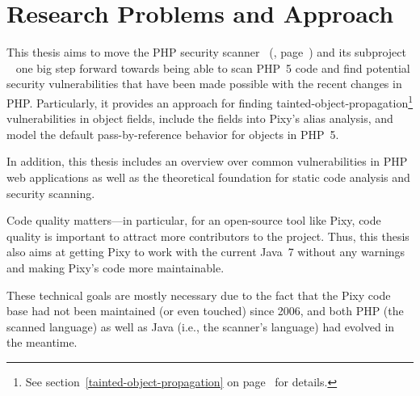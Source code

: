 \section{Research Problems and Approach}

This thesis aims to move the PHP security scanner ~(\cite{pixy}, page~\pageref{pixy}) and its subproject ~\cite{phpparser} one big step forward towards being able to scan PHP~5 code and find potential security vulnerabilities that have been made possible with the recent changes in PHP. Particularly, it provides an approach for finding tainted-object-propagation\footnote{See section~\ref{tainted-object-propagation} on page~\pageref{tainted-object-propagation} for details.} vulnerabilities in object fields, include the fields into Pixy's alias analysis, and model the default pass-by-reference behavior for objects in PHP~5.

In addition, this thesis includes an overview over common vulnerabilities in PHP web applications as well as the theoretical foundation for static code analysis and security scanning.

Code quality matters---in particular, for an open-source tool like Pixy, code quality is important to attract more contributors to the project. Thus, this thesis also aims at getting Pixy to work with the current Java~7 without any warnings and making Pixy's code more maintainable.

These technical goals are mostly necessary due to the fact that the Pixy code base had not been maintained (or even touched) since 2006, and both PHP (\ie the scanned language) as well as Java (i.e., the scanner's language) had evolved in the meantime.
